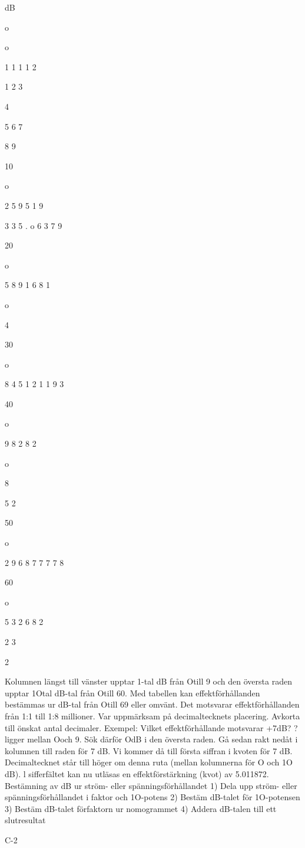 dB

o

o

1
1
1
1
2

1
2
3

4

5
6
7

8
9

10

o

2
5
9
5
1
9

3
3
5 . o
6
3
7
9

20

o

5
8
9
1
6
8
1

o

4

30

o

8
4
5
1
2
1
1
9
3

40

o

9
8
2
8
2

o

8

5
2

50

o

2
9
6
8
7
7
7
7
8

60

o

5
3
2
6
8
2

2
3

2

Kolumnen längst till vänster upptar 1-tal dB
från Otill 9 och den översta raden upptar 1Otal dB-tal från Otill 60.
Med tabellen kan effektförhållanden bestämmas ur dB-tal från Otill 69 eller omvänt.
Det motsvarar effektförhållanden från 1:1 till
1:8 millioner.
Var uppmärksam på decimaltecknets placering. Avkorta till önskat antal decimaler.
Exempel: Vilket effektförhållande motsvarar
+7dB?
?ligger mellan Ooch 9. Sök därför OdB i den
översta raden. Gå sedan rakt nedåt i kolumnen till raden för 7 dB. Vi kommer då till första
siffran i kvoten för 7 dB. Decimaltecknet står
till höger om denna ruta (mellan kolumnerna
för O och 1O dB).
l sifferfältet kan nu utläsas en effektförstärkning (kvot) av 5.011872.
Bestämning av dB ur ström- eller
spänningsförhållandet
1) Dela upp ström- eller spänningsförhållandet i faktor och 1O-potens
2) Bestäm dB-talet för 1O-potensen
3) Bestäm dB-talet förfaktorn ur nomogrammet
4) Addera dB-talen till ett slutresultat

C-2


